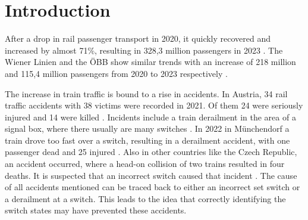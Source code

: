 \chapter{Introduction}
\label{sec:introduction}

After a drop in rail passenger transport in 2020, it quickly recovered and increased by almost 71\%, resulting in 328,3 million passengers in 2023 \cite{schienenpersonenverkehrAustria}.
The Wiener Linien and the ÖBB show similar trends with an increase of 218 million and 115,4 million passengers from 2020 to 2023 respectively \cite{wienerLinienAustria} \cite{oebbAustria}.

The increase in train traffic is bound to a rise in accidents.
In Austria, 34 rail traffic accidents with 38 victims were recorded in 2021.
Of them 24 were seriously injured and 14 were killed \cite{verkehrstatistik2022}.
Incidents include a train derailment in the area of a signal box, where there usually are many switches \cite{zugEntgleist}.
In 2022 in Münchendorf a train drove too fast over a switch, resulting in a derailment accident, with one passenger dead and 25 injured \cite{zugUnfall1Tod}.
Also in other countries like the Czech Republic, an accident occurred, where a head-on collision of two trains resulted in four deaths.
It is suspected that an incorrect switch caused that incident \cite{zugUnfallFrontal}.
The cause of all accidents mentioned can be traced back to either an incorrect set switch or a derailment at a switch.
This leads to the idea that correctly identifying the switch states may have prevented these accidents.


